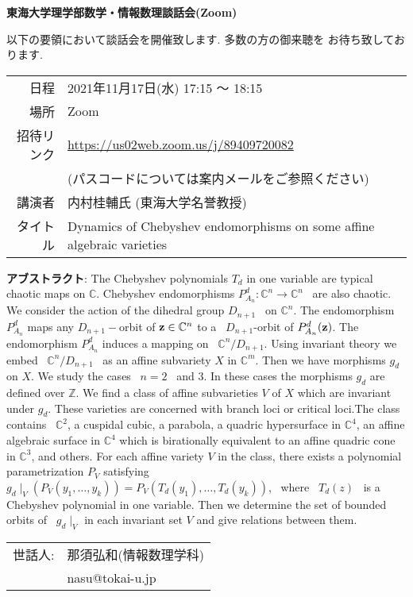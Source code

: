 \documentclass[12pt]{jarticle}
\title{}
\author{}
\date{}
\theoremstyle{definition}
\begin{document}

\begin{center}
 {\bf \Large 東海大学理学部数学・情報数理談話会(Zoom)}
\end{center}

以下の要領において談話会を開催致します. 多数の方の御来聴を
お待ち致しております. 

\smallskip

\begin{center}
  \begin{tabular}{rl}
    日程 & 2021年11月17日(水) 17:15 〜 18:15 \\
    場所 & Zoom\\
    招待リンク & \href{https://us02web.zoom.us/j/89409720082}{https://us02web.zoom.us/j/89409720082} \\
    & (パスコードについては案内メールをご参照ください) \\
    講演者 & 内村桂輔氏 (東海大学名誉教授)\\
    タイトル & Dynamics of Chebyshev endomorphisms on some affine algebraic varieties
  \end{tabular}
\end{center}

\noindent
{\bf アブストラクト}:\quad
The Chebyshev polynomials \(T_d\) in one variable are typical chaotic maps on \({\mathbb C}\). Chebyshev endomorphisms \(P_{A_n}^{d} : {\mathbb C}^n \to {\mathbb C}^n\) \ are also chaotic. We consider the action of the dihedral group \(D_{n+1}\) \ on \({\mathbb C}^n\). The endomorphism \(P_{A_n}^{d}\) maps any \(D_{n+1}-\)orbit of \({\bf z} \in {\mathbb C}^n\) to a \ \(D_{n+1}\)-orbit of \(P_{A_n}^{d}({\bf z})\). The endomorphism \(P_{A_n}^{d}\) induces a mapping on \ \({\mathbb C}^n/D_{n+1}\). Using invariant theory we embed \ \({\mathbb C}^n/D_{n+1}\) \ as an affine subvariety \(X\) in \({\mathbb C}^m\). Then we have morphisms \(g_d\) on \(X\). We study the cases \ \(n = 2\) \ and \(3\). In these cases the morphisms \(g_d\) are defined over \({\mathbb Z}\). We find a class of affine subvarieties \(V\) of \(X\) which are invariant under \(g_d\). These varieties are concerned with branch loci or critical loci.The class contains \ \({\mathbb C}^2\), a cuspidal cubic, a parabola, a quadric hypersurface in \({\mathbb C}^4\), an affine algebraic surface in \({\mathbb C}^4\) which is birationally equivalent to an affine quadric cone in \({\mathbb C}^3\), and others. For each affine variety \(V\) in the class, there exists a polynomial parametrization \(P_V\) satisfying \ \(g_d\mid_V(P_V(y_1, \dots , y_k)) = P_V(T_d(y_1), \dots , T_d(y_k))\), \ where \ \(T_d(z)\) \ is a Chebyshev polynomial in one variable. Then we determine the set of bounded orbits of \ \(g_d\mid_V\) in each invariant set \(V\) and give relations between them. 

\vskip 2cm

\begin{flushright}
  \begin{tabular}{rl}
      世話人: & 那須弘和(情報数理学科)\\
      & nasu@tokai-u.jp 
  \end{tabular}

\end{flushright}
\end{document}
